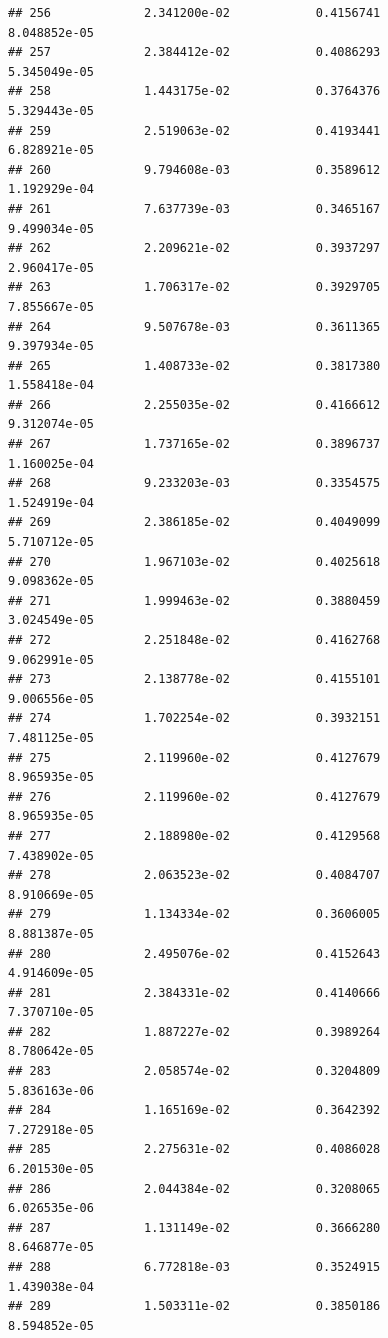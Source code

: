\documentclass[
]{article}
\begin{document}
\begin{verbatim}
## 256             2.341200e-02            0.4156741            8.048852e-05
## 257             2.384412e-02            0.4086293            5.345049e-05
## 258             1.443175e-02            0.3764376            5.329443e-05
## 259             2.519063e-02            0.4193441            6.828921e-05
## 260             9.794608e-03            0.3589612            1.192929e-04
## 261             7.637739e-03            0.3465167            9.499034e-05
## 262             2.209621e-02            0.3937297            2.960417e-05
## 263             1.706317e-02            0.3929705            7.855667e-05
## 264             9.507678e-03            0.3611365            9.397934e-05
## 265             1.408733e-02            0.3817380            1.558418e-04
## 266             2.255035e-02            0.4166612            9.312074e-05
## 267             1.737165e-02            0.3896737            1.160025e-04
## 268             9.233203e-03            0.3354575            1.524919e-04
## 269             2.386185e-02            0.4049099            5.710712e-05
## 270             1.967103e-02            0.4025618            9.098362e-05
## 271             1.999463e-02            0.3880459            3.024549e-05
## 272             2.251848e-02            0.4162768            9.062991e-05
## 273             2.138778e-02            0.4155101            9.006556e-05
## 274             1.702254e-02            0.3932151            7.481125e-05
## 275             2.119960e-02            0.4127679            8.965935e-05
## 276             2.119960e-02            0.4127679            8.965935e-05
## 277             2.188980e-02            0.4129568            7.438902e-05
## 278             2.063523e-02            0.4084707            8.910669e-05
## 279             1.134334e-02            0.3606005            8.881387e-05
## 280             2.495076e-02            0.4152643            4.914609e-05
## 281             2.384331e-02            0.4140666            7.370710e-05
## 282             1.887227e-02            0.3989264            8.780642e-05
## 283             2.058574e-02            0.3204809            5.836163e-06
## 284             1.165169e-02            0.3642392            7.272918e-05
## 285             2.275631e-02            0.4086028            6.201530e-05
## 286             2.044384e-02            0.3208065            6.026535e-06
## 287             1.131149e-02            0.3666280            8.646877e-05
## 288             6.772818e-03            0.3524915            1.439038e-04
## 289             1.503311e-02            0.3850186            8.594852e-05

\end{verbatim}
\end{document}
